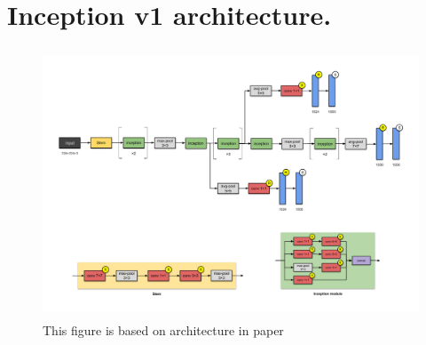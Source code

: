 \documentclass[12pt]{report}
\begin{document}
	\section{Inception v1 architecture.}
	\begin{figure}[h]
		\begin{center}
			\includegraphics[width=\textwidth,height=8cm]{A.png}\caption{This figure is based on architecture in paper \cite{ref1}}\label{fig:A}
		\end{center}
	\end{figure}
\end{document}
